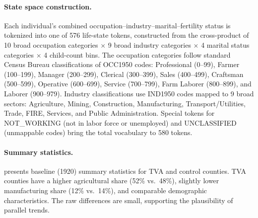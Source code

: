 \documentclass[12pt]{article}
\begin{document}
\paragraph{State space construction.} Each individual's combined occupation--industry--marital--fertility status is tokenized into one of 576 life-state tokens, constructed from the cross-product of 10 broad occupation categories $\times$ 9 broad industry categories $\times$ 4 marital status categories $\times$ 4 child-count bins. The occupation categories follow standard Census Bureau classifications of OCC1950 codes: Professional (0--99), Farmer (100--199), Manager (200--299), Clerical (300--399), Sales (400--499), Craftsman (500--599), Operative (600--699), Service (700--799), Farm Laborer (800--899), and Laborer (900--979). Industry classifications use IND1950 codes mapped to 9 broad sectors: Agriculture, Mining, Construction, Manufacturing, Transport/Utilities, Trade, FIRE, Services, and Public Administration. Special tokens for NOT\_WORKING (not in labor force or unemployed) and UNCLASSIFIED (unmappable codes) bring the total vocabulary to 580 tokens.

\paragraph{Summary statistics.}  presents baseline (1920) summary statistics for TVA and control counties. TVA counties have a higher agricultural share (52\% vs.\ 48\%), slightly lower manufacturing share (12\% vs.\ 14\%), and comparable demographic characteristics. The raw differences are small, supporting the plausibility of parallel trends.
\end{document}
